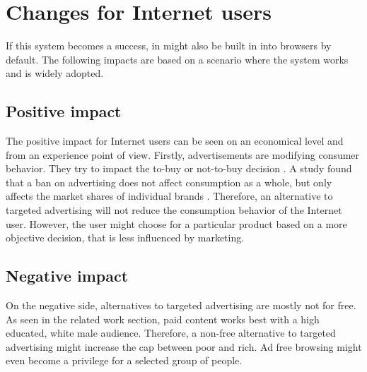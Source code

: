\section{Changes for Internet users}
If this system becomes a success, in might also be built in into browsers by default. The following impacts are based on a scenario where the system works and is widely adopted. 

\subsection{Positive impact}
The positive impact for Internet users can be seen on an economical level and from an experience point of view. Firstly, advertisements are modifying consumer behavior. They try to impact the to-buy or not-to-buy decision \cite{johnson2007consumer}. A study found that a ban on advertising does not affect consumption as a whole, but only affects the market shares of individual brands \cite{advertisementsconsumption}. Therefore, an alternative to targeted advertising will not reduce the consumption behavior of the Internet user. However, the user might choose for a particular product based on a more objective decision, that is less influenced by marketing.

\subsection{Negative impact}
On the negative side, alternatives to targeted advertising are mostly not for free. As seen in the related work section, paid content works best with a high educated, white male audience. Therefore, a non-free alternative to targeted advertising might increase the cap between poor and rich. Ad free browsing might even become a privilege for a selected group of people.
